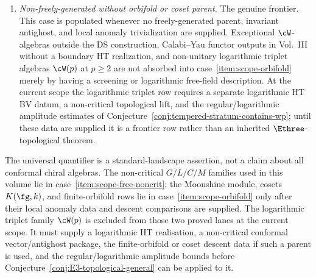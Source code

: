 \begin{remark}
\begin{enumerate}[label=\textup{(\arabic*)}]
 trivialized by a local cocycle/coboundary computation, or the
 coset anomaly (coset) vanishes. Under (a)--(c), factorisation
 $\Ethree$-structure descends because finite group invariants and
 commutants preserve $E_n$-structure at the level of factorisation
 algebras \textup{(}Costello--Gwilliam~\cite{CG17}, Vol.~I
 \S 5\textup{)}.
 Covers the invariant subalgebra $V_\Lambda^+$ of the Leech lattice
 VOA (see Remark~\ref{rem:monster-orbifold-route});
 covers parafermion algebras $K(\fg,k)$ as the coset of $V_k(\fg)$
 by its Heisenberg subalgebra. The full Moonshine module
 $V^\natural = V_\Lambda \,/\!/\, \Z/2$
 (twisted-sector orbifold) is covered by
 Theorem~\ref{thm:monster-orbifold-e3} only on the finite-orbifold
 descent locus: the normalized local cocycle must satisfy
 \(\alpha(\sigma,\sigma,\sigma)=+1\), equivalently
 \([\alpha]=0\in H^3(B\Z/2,U(1))\), and the corresponding BV descent
 must identify the boundary with the FLM orbifold. Even unimodularity of
 the Leech lattice and $\SL_2(\Z)$-invariance of the Monster partition
 function~$J(\tau)$ are compatibility checks, not substitutes for that
 local cocycle computation.
\item\label{item:scope-frontier}
 \emph{Non-freely-generated without orbifold or coset parent.}
 The genuine frontier. This case is populated whenever no
 freely-generated parent, invariant antighost, and local anomaly
 trivialization are supplied.  Exceptional $\cW$-algebras outside the
 DS construction, Calabi--Yau functor outputs in Vol.~III without a
 boundary HT realization, and non-unitary logarithmic triplet algebras
 $\cW(p)$ at $p\ge2$ are not absorbed into
 case~\ref{item:scope-orbifold} merely by having a screening or
 logarithmic free-field description.  At the current scope the
 logarithmic triplet row requires a separate logarithmic HT BV datum,
 a non-critical topological lift, and the regular/logarithmic
 amplitude estimates of
 Conjecture~\ref{conj:tempered-stratum-contains-wp}; until these data
 are supplied it is a frontier row rather than an inherited
 $\Ethree$-topological theorem.
\end{enumerate}
The universal quantifier is a standard-landscape assertion, not a
claim about all conformal chiral algebras. The non-critical
$G/L/C/M$ families used in this volume lie in
case~\ref{item:scope-free-noncrit}; the Moonshine module, cosets
$K(\fg,k)$, and finite-orbifold rows lie in
case~\ref{item:scope-orbifold} only after their local anomaly data and
descent comparisons are supplied.  The logarithmic triplet family
$\cW(p)$ is excluded from those two proved lanes at the current scope.
It must supply a logarithmic HT realisation, a non-critical conformal
vector/antighost package, the finite-orbifold or coset descent data if
such a parent is used, and the regular/logarithmic amplitude bounds
before Conjecture~\ref{conj:E3-topological-general} can be applied to
it.
\end{remark}

